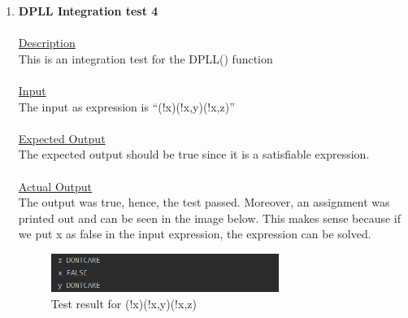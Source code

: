 \documentclass{article}
\newcommand{\quotes}[1]{``#1''}
\begin{document}
\begin{enumerate}
					\item \textbf{DPLL Integration test 4}\\\\
		\underline{Description}\\
		\indent This is an integration test for the DPLL() function\\\\
		\underline{Input}\\
		\indent The input as expression is \quotes{(!x)(!x,y)(!x,z)}\\	\\
		\underline{Expected Output}\\
		\indent The expected output should be true since it is a satisfiable expression.\\\\
		\underline{Actual Output}\\
		The output was true, hence, the test passed. Moreover, an assignment was printed out and can be seen in the image below. This makes sense because if we put x as false in the input expression, the expression can be solved. 
				\begin{figure}[H]
					\centering
			 			\includegraphics[width=0.7\textwidth]{dplltest4.png}
			 			\centering
			  			\caption{Test result for (!x)(!x,y)(!x,z)}
			  			\label{fig:dplltest4}
					\end{figure}		


\end{enumerate}
\end{document}
